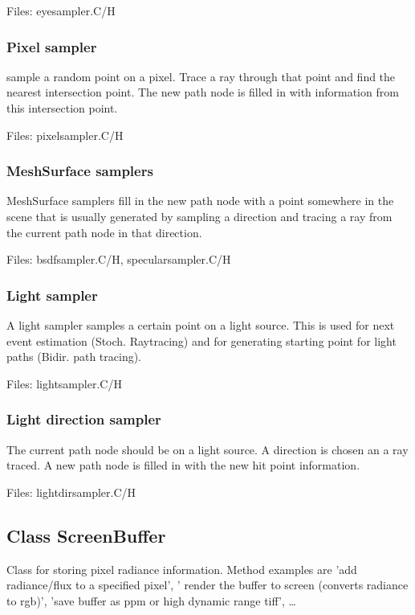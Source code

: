 \documentclass[11pt]{report}
\begin{document}
Files: eyesampler.C/H

\subsubsection{Pixel sampler}

sample a random point on a pixel. Trace a ray through that point
and find the nearest intersection point. The new path node is filled
in with information from this intersection point.

Files: pixelsampler.C/H

\subsubsection{MeshSurface samplers}

MeshSurface samplers fill in the new path node with a point somewhere
in the scene that is usually generated by sampling a direction
and tracing a ray from the current path node in that direction.

Files: bsdfsampler.C/H, specularsampler.C/H

\subsubsection{Light sampler}

A light sampler samples a certain point on a light source. This
is used for next event estimation (Stoch. Raytracing) and
for generating starting point for light paths (Bidir. path tracing).

Files: lightsampler.C/H

\subsubsection{Light direction sampler}

The current path node should be on a light source. A direction
is chosen an a ray traced. A new path node is filled in with
the new hit point information.

Files: lightdirsampler.C/H


\subsection{Class ScreenBuffer}

Class for storing pixel radiance information. 
Method examples are 'add radiance/flux to a specified pixel', '
render the buffer to screen (converts radiance to rgb)', 'save buffer
as ppm or high dynamic range tiff', \ldots
\end{document}
